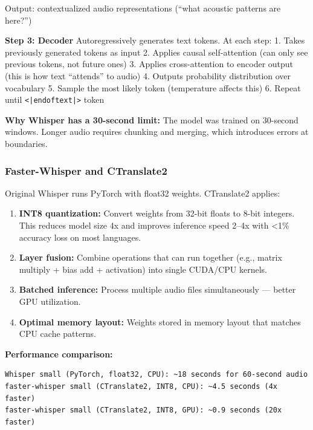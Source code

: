 \documentclass[
  11pt,
]{article}
\newcommand{\passthrough}[1]{#1}
\begin{document}
Output: contextualized audio representations (``what acoustic patterns
are here?'')

\textbf{Step 3: Decoder} Autoregressively generates text tokens. At each
step: 1. Takes previously generated tokens as input 2. Applies causal
self-attention (can only see previous tokens, not future ones) 3.
Applies cross-attention to encoder output (this is how text ``attends''
to audio) 4. Outputs probability distribution over vocabulary 5. Sample
the most likely token (temperature affects this) 6. Repeat until
\passthrough{\lstinline!<|endoftext|>!} token

\textbf{Why Whisper has a 30-second limit:} The model was trained on
30-second windows. Longer audio requires chunking and merging, which
introduces errors at boundaries.

\hypertarget{faster-whisper-and-ctranslate2}{%
\subsubsection{Faster-Whisper and
CTranslate2}\label{faster-whisper-and-ctranslate2}}

Original Whisper runs PyTorch with float32 weights. CTranslate2 applies:

\begin{enumerate}
\def\labelenumi{\arabic{enumi}.}
\item
  \textbf{INT8 quantization:} Convert weights from 32-bit floats to
  8-bit integers. This reduces model size 4x and improves inference
  speed 2--4x with \textless1\% accuracy loss on most languages.
\item
  \textbf{Layer fusion:} Combine operations that can run together (e.g.,
  matrix multiply + bias add + activation) into single CUDA/CPU kernels.
\item
  \textbf{Batched inference:} Process multiple audio files
  simultaneously --- better GPU utilization.
\item
  \textbf{Optimal memory layout:} Weights stored in memory layout that
  matches CPU cache patterns.
\end{enumerate}

\textbf{Performance comparison:}

\begin{lstlisting}
Whisper small (PyTorch, float32, CPU): ~18 seconds for 60-second audio
faster-whisper small (CTranslate2, INT8, CPU): ~4.5 seconds (4x faster)
faster-whisper small (CTranslate2, INT8, GPU): ~0.9 seconds (20x faster)
\end{lstlisting}
\end{document}
